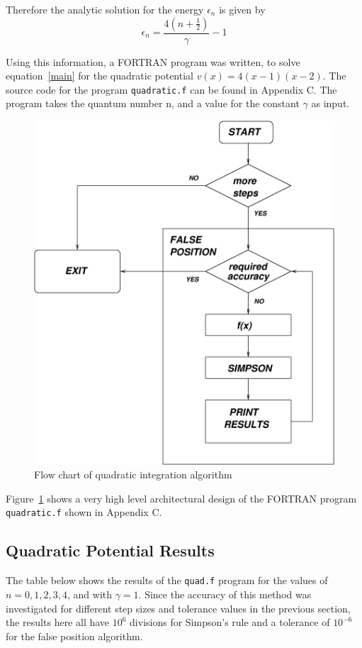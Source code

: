 \documentclass[a4paper]{IEEEtran}
\begin{document}
    Therefore the analytic solution for the energy $\epsilon_n$ is given
    by
    \begin{equation}
    \label{quadenergy}
    \epsilon_n = \frac{4\left(n + \frac{1}{2}\right)}{\gamma} - 1 \nonumber
    \end{equation}

    Using this information, a FORTRAN program was written, to solve
    equation~\ref{main} for the quadratic potential $v(x) = 4(x-1)(x-2)$.
    The source code for the program \verb+quadratic.f+ can be found in 
    Appendix C. The program takes the quantum number n, and a value for the constant
    $\gamma$ as input.

    \begin{figure}
        \centering
        \includegraphics[width=0.8\columnwidth]{flow.eps}
        \caption{Flow chart of quadratic integration algorithm}
        \label{fig:flow-chart}
    \end{figure} 

    Figure~\ref{fig:flow-chart} shows a very high level architectural design of
    the FORTRAN program \verb+quadratic.f+ shown in Appendix C.

\subsection{Quadratic Potential Results}
    The table below shows the results of the \verb+quad.f+ program for
    the values of $n = 0,1,2,3,4$, and with $\gamma = 1$. Since the
    accuracy of this method was investigated for different step sizes
    and tolerance values in the previous section, the results here all
    have $10^6$ divisions for Simpson's rule and a tolerance of
    $10^{-6}$ for the false position algorithm.
  
\end{document}
